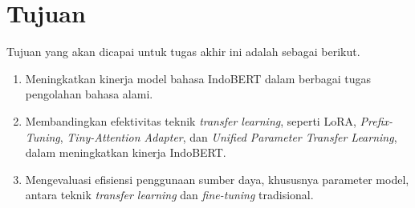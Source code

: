 \section{Tujuan}

Tujuan yang akan dicapai untuk tugas akhir ini adalah sebagai berikut.

\begin{enumerate}
    \item Meningkatkan kinerja model bahasa IndoBERT dalam berbagai tugas pengolahan bahasa alami.
    \item Membandingkan efektivitas teknik \textit{transfer learning}, seperti LoRA, \textit{Prefix-Tuning}, \textit{Tiny-Attention Adapter}, dan \textit{Unified Parameter Transfer Learning}, dalam meningkatkan kinerja IndoBERT.
    \item Mengevaluasi efisiensi penggunaan sumber daya, khususnya parameter model, antara teknik \textit{transfer learning} dan \textit{fine-tuning} tradisional.
\end{enumerate}